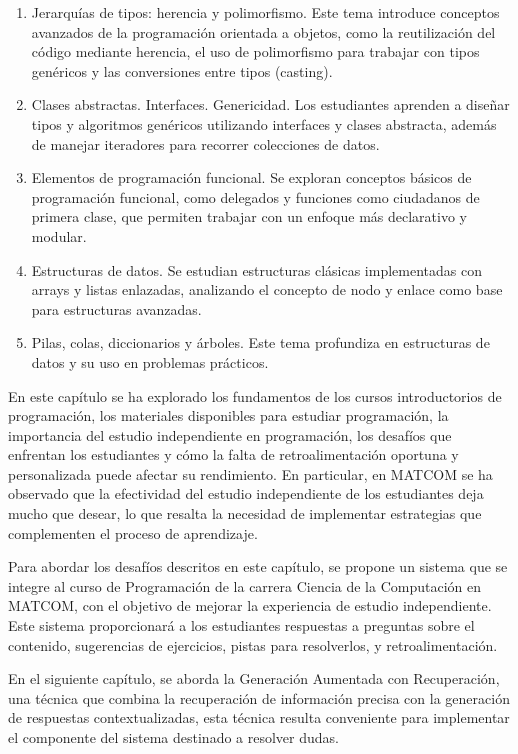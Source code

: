 \begin{enumerate}
    \item Jerarquías de tipos: herencia y polimorfismo.
    Este tema introduce conceptos avanzados de la programación orientada a objetos, como la reutilización del código mediante herencia, el uso de polimorfismo para trabajar con tipos genéricos y las conversiones entre tipos (casting).  

    \item Clases abstractas. Interfaces. Genericidad.
    Los estudiantes aprenden a diseñar tipos y algoritmos genéricos utilizando interfaces y clases abstracta, además de manejar iteradores para recorrer colecciones de datos.

    \item Elementos de programación funcional.
    Se exploran conceptos básicos de programación funcional, como delegados y funciones como ciudadanos de primera clase, que permiten trabajar con un enfoque más declarativo y modular.

    \item Estructuras de datos.
    Se estudian estructuras clásicas implementadas con arrays y listas enlazadas, analizando el concepto de nodo y enlace como base para estructuras avanzadas.  

    \item Pilas, colas, diccionarios y árboles.
    Este tema profundiza en estructuras de datos y su uso en problemas prácticos.
\end{enumerate}

En este capítulo se ha explorado los fundamentos de los cursos introductorios de programación, los materiales disponibles para estudiar programación, la importancia del estudio independiente en programación, los desafíos que enfrentan los estudiantes y cómo la falta de retroalimentación oportuna y personalizada puede afectar su rendimiento. En particular, en \mbox{MATCOM} se ha observado que la efectividad del estudio independiente de los estudiantes deja mucho que desear, lo que resalta la necesidad de implementar estrategias que complementen el proceso de aprendizaje.

Para abordar los desafíos descritos en este capítulo, se propone un sistema que se integre al curso de Programación de la carrera Ciencia de la Computación en \mbox{MATCOM}, con el objetivo de  mejorar la experiencia de estudio independiente. Este sistema proporcionará  a los estudiantes respuestas a preguntas sobre el contenido, sugerencias de ejercicios, pistas para resolverlos, y retroalimentación.

En el siguiente capítulo, se aborda la Generación Aumentada con Recuperación, una técnica que combina la recuperación de información precisa con la generación de respuestas contextualizadas, esta técnica resulta conveniente para implementar el componente del sistema destinado a resolver dudas.
